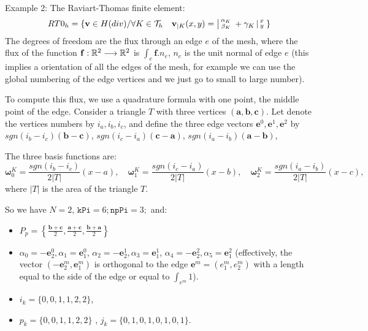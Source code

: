  Example 2: The Raviart-Thomas finite element:
\begin{equation}
         RT0_{h} = \{ \mathbf{v} \in H(div) / \forall K \in
         \mathcal{T}_{h} \quad  \mathbf{v}_{|K}(x,y) =
         \left|\begin{smallmatrix} \alpha_{K} \\ \beta_{K} \end{smallmatrix}\right. + \gamma_{K}\left|\begin{smallmatrix} x \\ y \end{smallmatrix}\right.  \}
         \label{eq:RT0-fe}
\end{equation}
 The degrees of freedom are the flux   through an edge $e$ of the mesh, where the flux of
 the function $\mathbf{f} : \mathbb{R}^2 \longrightarrow \mathbb{R}^2 $ is $\int_{e} \mathbf{f}.n_{e}$,
 $n_{e}$ is the unit normal of edge $e$ (this implies a orientation of all the edges of the mesh,
 for example we can use the global numbering of the edge vertices and we just go to small to large number).


  To compute this flux, we use a quadrature formula with one point, the middle point of the edge. Consider a triangle $T$ with three vertices $(\mathbf{a},\mathbf{b},\mathbf{c})$.
Let denote the  vertices numbers by $i_{a},i_{b},i_{c}$, and define the three edge vectors $\mathbf{e}^{0},\mathbf{e}^{1},\mathbf{e}^{2}$
by $ sgn(i_{b}-i_{c})(\mathbf{b}-\mathbf{c})$, $sgn(i_{c}-i_{a})(\mathbf{c}-\mathbf{a})$, $sgn(i_{a}-i_{b})(\mathbf{a}-\mathbf{b})$,

 The three basis functions are:
\begin{equation}
 \boldsymbol{\omega}^{K}_{0}= \frac{sgn(i_{b}-i_{c})}{2|T|}(x-a),\quad  \boldsymbol{\omega}^{K}_{1}= \frac{sgn(i_{c}-i_{a})}{2|T|}(x-b),\quad  \boldsymbol{\omega}^{K}_{2}= \frac{sgn(i_{a}-i_{b})}{2|T|}(x-c),
\end{equation}
where $|T|$ is the area of the triangle $T$.

So we have  $N=2$, $\mathtt{kPi}=6; \mathtt{npPi}=3;$ and:
\begin{itemize}
\item $
P_{p} = \left\{\frac{\mathbf{b}+\mathbf{c}}{2},
\frac{\mathbf{a}+\mathbf{c}}{2},
\frac{\mathbf{b}+\mathbf{a}}{2} \right\}$

\item
 $\alpha_{0}= - \mathbf{e}^{0}_{2}, \alpha_{1}= \mathbf{e}^{0}_{1}$,
 $\alpha_{2}= - \mathbf{e}^{1}_{2}, \alpha_{3}= \mathbf{e}^{1}_{1}$,
 $\alpha_{4}= - \mathbf{e}^{2}_{2}, \alpha_{5}= \mathbf{e}^{2}_{1}$ (effectively, the vector
 $ ( -\mathbf{e}^{m}_{2}, \mathbf{e}^{m}_{1}) $ is orthogonal to the edge $\mathbf{e}^{m}= (e^m_{1},e^m_{2})$ with
 a length equal to the side of the edge or equal to  $\int_{e^m} 1$).
\item $i_{k}=\{0,0,1,1,2,2\}$,
\item $p_{k}=\{0,0,1,1,2,2\}$ ,  $j_{k}=\{0,1,0,1,0,1,0,1\}$.
\end{itemize}


